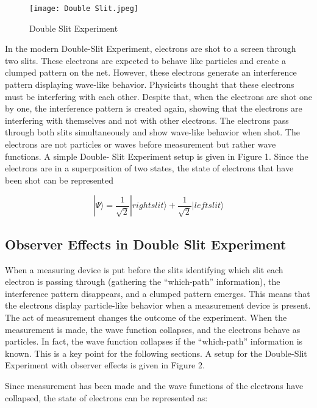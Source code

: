 \documentclass{article}
\begin{document}
\begin{figure}[h]
\centering
     \texttt{[image: Double Slit.jpeg]}
      \caption{Double Slit Experiment}
       \label{fig:DSE}
\end{figure}

In the modern Double-Slit Experiment, electrons are shot
to a screen through two slits. These electrons are expected
to behave like particles and create a clumped pattern on the
net. However, these electrons generate an interference pattern displaying wave-like behavior. Physicists thought that
these electrons must be interfering with each other. Despite
that, when the electrons are shot one by one, the interference
pattern is created again, showing that the electrons are interfering with themselves and not with other electrons. The
electrons pass through both slits simultaneously and show
wave-like behavior when shot. The electrons are not particles
or waves before measurement but rather wave functions. A
simple Double- Slit Experiment setup is given in Figure 1.
Since the electrons are in a superposition of two states, the
state of electrons that have been shot can be represented


\begin{equation}
    |\Psi\rangle=\frac{1}{\sqrt{2}}|right slit\rangle+ \frac{1}{\sqrt{2}}|left slit\rangle
\end{equation}



\subsection{\Large Observer Effects in Double Slit Experiment}

When a measuring device is put before the slits identifying which slit each electron is passing through (gathering the
“which-path” information), the interference pattern disappears, and a clumped pattern emerges. This means that the
electrons display particle-like behavior when a measurement
device is present. The act of measurement changes the outcome of the experiment.
When the measurement is made, the wave function collapses, and the electrons behave as particles. In fact, the wave
function collapses if the “which-path” information is known.
This is a key point for the following sections. A setup for
the Double-Slit Experiment with observer effects is given in
Figure 2.

Since measurement has been made and the wave functions
of the electrons have collapsed, the state of electrons can be
represented as:
\end{document}
